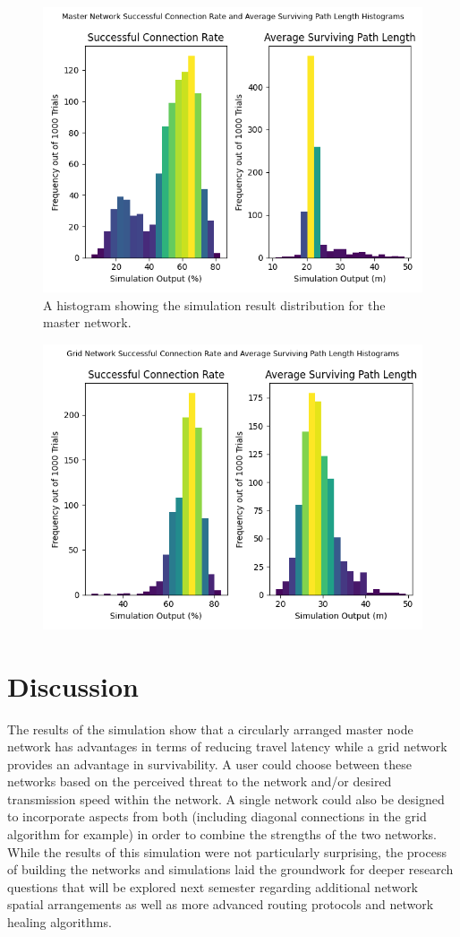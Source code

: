 \documentclass[10pt]{article}
\begin{document}
\begin{figure}
\begin{center}
\includegraphics[width=0.6\columnwidth]{figures/MasterHistogram.png}
\end{center}
\caption{A histogram showing the simulation result distribution for the master network.}
\end{figure}

\begin{figure}
\begin{center}
\includegraphics[width=0.6\columnwidth]{figures/GridHistogram.png}
\end{center}
\end{figure}

\section{Discussion}
The results of the simulation show that a circularly arranged master node network has advantages in terms of reducing travel latency while a grid network provides an advantage in survivability. A user could choose between these networks based on the perceived threat to the network and/or desired transmission speed within the network. A single network could also be designed to incorporate aspects from both  (including diagonal connections in the grid algorithm for example) in order to combine the strengths of the two networks. While the results of this simulation were not particularly surprising, the process of building the networks and simulations laid the groundwork for deeper research questions that will be explored next semester regarding additional network spatial arrangements as well as more advanced routing protocols and network healing algorithms.
\end{document}
